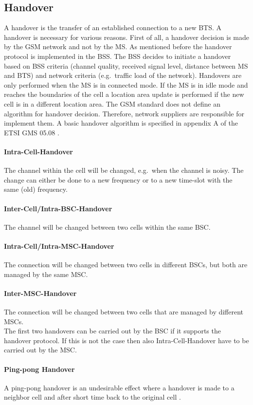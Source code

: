 \documentclass[master,english]{hgbthesis}
\begin{document}
\subsection{Handover}
A handover is the transfer of an established connection to a new BTS. A handover is necessary for various reasons. First of all, a handover decision is made by the GSM network and not by the MS. As mentioned before the handover protocol is implemented in the BSS. The BSS decides to initiate a handover based on BSS criteria (channel quality, received signal level, distance between MS and BTS) and network criteria (e.g.\ traffic load of the network).
Handovers are only performed when the MS is in connected mode. If the MS is in idle mode and reaches the boundaries of the cell a location area update is performed if the new cell is in a different location area.
The GSM standard does not define an algorithm for handover decision. Therefore, network suppliers are responsible for implement them. A basic handover algorithm is specified in appendix A of the ETSI GMS 05.08 \cite{Etsi19942}.
\paragraph{Intra-Cell-Handover} The channel within the cell will be changed, e.g.\ when the channel is noisy. The change can either be done to a new frequency or to a new time-slot with the same (old) frequency.
\paragraph{Inter-Cell/Intra-BSC-Handover}
The channel will be changed between two cells within the same BSC.
\paragraph{Intra-Cell/Intra-MSC-Handover}
The connection will be changed between two cells in different BSCs, but both are managed by the same MSC.
\paragraph{Inter-MSC-Handover}
The connection will be changed between two cells that are managed by different MSCs.
\\
The first two handovers can be carried out by the BSC if it supports the handover protocol. If this is not the case then also Intra-Cell-Handover have to be carried out by the MSC.
\paragraph{Ping-pong Handover}
A ping-pong handover is an undesirable effect where a handover is made to a neighbor cell and after short time back to the original cell \cite{Junius1995}.
\end{document}
